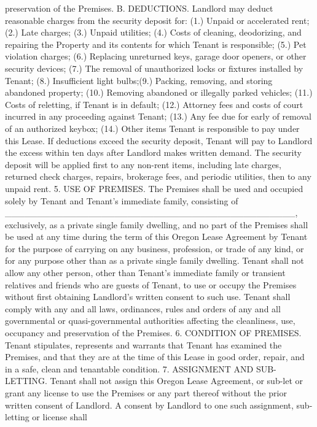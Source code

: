 preservation of the Premises.
B. DEDUCTIONS. Landlord may deduct reasonable charges from the security deposit for:
(1.) Unpaid or accelerated rent;
(2.) Late charges;
(3.) Unpaid utilities;
(4.) Costs of cleaning, deodorizing, and repairing the Property and its contents for
which Tenant is responsible;
(5.) Pet violation charges;
(6.) Replacing unreturned keys, garage door openers, or other security devices;
(7.) The removal of unauthorized locks or fixtures installed by Tenant;
(8.) Insufficient light bulbs;(9.) Packing, removing, and storing abandoned property;
(10.) Removing abandoned or illegally parked vehicles;
(11.) Costs of reletting, if Tenant is in default;
(12.) Attorney fees and costs of court incurred in any proceeding against Tenant;
(13.) Any fee due for early of removal of an authorized keybox;
(14.) Other items Tenant is responsible to pay under this Lease.
If deductions exceed the security deposit, Tenant will pay to Landlord the excess within ten days
after Landlord makes written demand. The security deposit will be applied first to any non-rent
items, including late charges, returned check charges, repairs, brokerage fees, and periodic
utilities, then to any unpaid rent.
5. USE OF PREMISES. The Premises shall be used and occupied solely by Tenant and Tenant's
immediate family, consisting of _____________________________________________,
exclusively, as a private single family dwelling, and no part of the Premises shall be used at any
time during the term of this Oregon Lease Agreement by Tenant for the purpose of carrying on
any business, profession, or trade of any kind, or for any purpose other than as a private single
family dwelling. Tenant shall not allow any other person, other than Tenant's immediate family or
transient relatives and friends who are guests of Tenant, to use or occupy the Premises without
first obtaining Landlord's written consent to such use. Tenant shall comply with any and all laws,
ordinances, rules and orders of any and all governmental or quasi-governmental authorities
affecting the cleanliness, use, occupancy and preservation of the Premises.
6. CONDITION OF PREMISES. Tenant stipulates, represents and warrants that Tenant has
examined the Premises, and that they are at the time of this Lease in good order, repair, and in a
safe, clean and tenantable condition.
7. ASSIGNMENT AND SUB-LETTING. Tenant shall not assign this Oregon Lease Agreement, or
sub-let or grant any license to use the Premises or any part thereof without the prior written
consent of Landlord. A consent by Landlord to one such assignment, sub-letting or license shall

